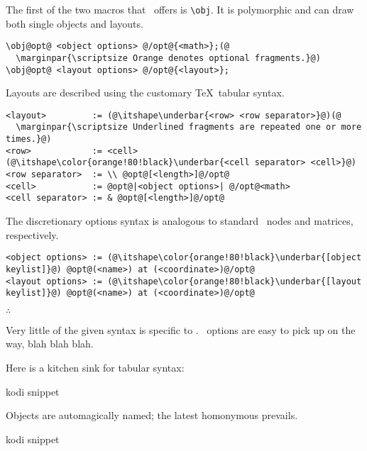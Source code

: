 The first of the two macros that \koDi\ offers is \lstinline|\obj|.
It is polymorphic and can draw both single objects and layouts.

\begin{lstlisting}
\obj@opt@ <object options> @/opt@{<math>};(@
  \marginpar{\scriptsize Orange denotes optional fragments.}@)
\obj@opt@ <layout options> @/opt@{<layout>};
\end{lstlisting}

Layouts are described using the customary \TeX\ tabular syntax.

\begin{lstlisting}
<layout>         := (@\itshape\underbar{<row> <row separator>}@)(@
  \marginpar{\scriptsize Underlined fragments are repeated one or more times.}@)
<row>            := <cell> (@\itshape\color{orange!80!black}\underbar{<cell separator> <cell>}@)
<row separator>  := \\ @opt@[<length>]@/opt@
<cell>           := @opt@|<object options>| @/opt@<math>
<cell separator> := & @opt@[<length>]@/opt@
\end{lstlisting}

The discretionary options syntax is analogous to standard \TikZ\ nodes and
matrices, respectively.

\begin{lstlisting}
<object options> := (@\itshape\color{orange!80!black}\underbar{[object keylist]}@) @opt@(<name>) at (<coordinate>)@/opt@
<layout options> := (@\itshape\color{orange!80!black}\underbar{[layout keylist]}@) @opt@(<name>) at (<coordinate>)@/opt@
\end{lstlisting}

\hfill$\therefore$\hfill\null

Very little of the given syntax is specific to \koDi.
\TikZ\ options are easy to pick up on the way,
blah blah blah.

Here is a kitchen sink for tabular syntax:

\begin{tcblisting}{kodi snippet}
\end{tcblisting}

Objects are automagically named; the latest homonymous prevails.

\begin{tcblisting}{kodi snippet}
\end{tcblisting}

